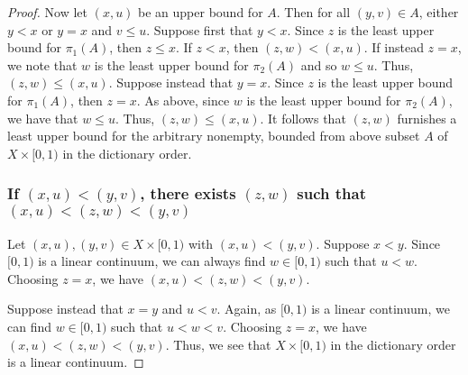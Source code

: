 \begin{solution}
\begin{proof}
    Now let $(x, u)$ be an upper bound for $A$.
    Then for all $(y, v) \in A$, either $y < x$ or $y = x$ and $v \leq u$.
    Suppose first that $y < x$.
    Since $z$ is the least upper bound for $\pi_1(A)$, then $z \leq x$.
    If $z < x$, then $(z, w) < (x, u)$.
    If instead $z = x$, we note that $w$ is the least upper bound for $\pi_2(A)$ and so $w \leq u$.
    Thus, $(z, w) \leq (x, u)$.
    Suppose instead that $y = x$. Since $z$ is the least upper bound for $\pi_1(A)$, then $z = x$.
    As above, since $w$ is the least upper bound for $\pi_2(A)$, we have that $w \leq u$.
    Thus, $(z, w) \leq (x, u)$.
    It follows that $(z, w)$ furnishes a least upper bound for the arbitrary nonempty, bounded from above subset $A$ of $X \times [0, 1)$ in the dictionary order.

    \subsubsection*{If $(x, u) < (y, v)$, there exists $(z, w)$ such that $(x, u) < (z, w) < (y, v)$}
    Let $(x, u), (y, v) \in X \times [0, 1)$ with $(x, u) < (y, v)$.
    Suppose $x < y$.
    Since $[0, 1)$ is a linear continuum, we can always find $w \in [0, 1)$ such that $u < w$.
    Choosing $z = x$, we have $(x, u) < (z, w) < (y, v)$.

    Suppose instead that $x = y$ and $u < v$.
    Again, as $[0, 1)$ is a linear continuum, we can find $w \in [0, 1)$ such that $u < w < v$.
    Choosing $z = x$, we have $(x, u) < (z, w) < (y, v)$.
    Thus, we see that $X \times [0, 1)$ in the dictionary order is a linear continuum.
  \end{proof}
\end{solution}
\newpage

